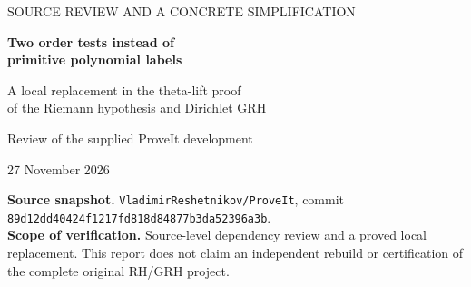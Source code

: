 \documentclass[11pt,a4paper]{article}
\theoremstyle{definition}
\theoremstyle{remark}
\newcommand{\F}{\mathbb F}
\newcommand{\code}[1]{{\small\nolinkurl{#1}}}
\begin{document}
\hypersetup{pageanchor=false}
\begin{titlepage}
\color{ink}
\vspace*{12mm}
{\large SOURCE REVIEW AND A CONCRETE SIMPLIFICATION\par}
\vspace{8mm}
{\huge\bfseries Two order tests instead of\\[3pt] primitive polynomial labels\par}
\vspace{7mm}
{\Large A local replacement in the theta-lift proof\\ of the Riemann hypothesis and Dirichlet GRH\par}
\vspace{10mm}
{\large Review of the supplied ProveIt development\par}
{\large 27 November 2026\par}
\vspace{12mm}
\begin{abstract}
\noindent
The finite-field primitive-polynomial condition in the supplied proof is stronger than its
consumers require. For rank \(r=3^a\), replace a root generating
\(\F_{q^r}^{\times}\) by a root \(z\) satisfying two order tests,
\(z^{(q^r-1)/2}\ne1\) and \(z^{(q^r-1)/3}\ne1\), and one explicit subgroup
exclusion, \(z^{3(q^{r/3}-1)}\ne1\).
These conditions preserve full Frobenius orbits after every prime-power operation,
survive the original scalar normalization, and give a common scalar power of sufficient
order after weakening one internal interface. The resulting irreducible labels number
exactly \((q^r-3q^{r/3}+2)/(3r)\).
Consequently one block of residue fields of equal cardinality has bad share at most
\(f\varepsilon+\exp(-f/(6r))\), replacing the source's
\(f\varepsilon+\exp(-f/[2r(2r\log q+1)])\).
This removes the analytic totient estimate from this branch.
The proposal is distinct from all five existing proposal directories.
Full mathematical proofs, source anchors, executable exact checks, and a checked
Lean support file accompany this report. Integration into the complete GRH development
remains to be done.
\end{abstract}
\vfill
\small
\textbf{Source snapshot.}
\code{VladimirReshetnikov/ProveIt}, commit\\
\code{89d12dd40424f1217fd818d84877b3da52396a3b}.\\[4pt]
\textbf{Scope of verification.}
Source-level dependency review and a proved local replacement.
This report does not claim an independent rebuild or certification of the complete
original RH/GRH project.
\end{titlepage}
\hypersetup{pageanchor=true}
\setcounter{tocdepth}{1}
\tableofcontents
\newpage
{}
\end{document}
